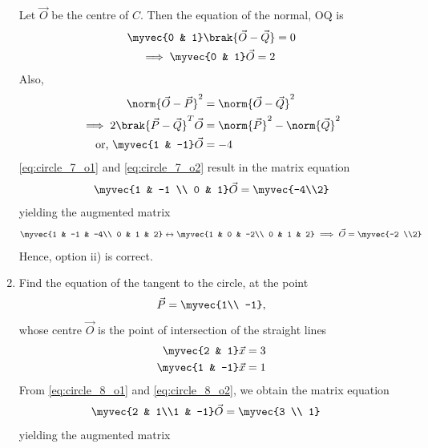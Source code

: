 \begin{enumerate}[label=\arabic*.,ref=\thesubsection.\theenumi]
\solution Let $\vec{O}$ be the centre of $C$. Then the equation of the normal, OQ is
\begin{align}
\myvec{0 & 1}\brak{\vec{O}-\vec{Q}} &= 0
\nonumber \\ 
\implies \myvec{0 & 1}\vec{O} = 2
\label{eq:circle_7_o1}
\end{align}
%
Also, 
\begin{align}
\norm{\vec{O}-\vec{P}}^2&=\norm{\vec{O}-\vec{Q}}^2 
\nonumber \\
\implies 2\brak{\vec{P}-\vec{Q}}^T\vec{O} &= \norm{\vec{P}}^2-\norm{\vec{Q}}^2 
\nonumber \\
\text{or, } \myvec{1 & -1}\vec{O} &= -4
\label{eq:circle_7_o2}
\end{align}
%
\eqref{eq:circle_7_o1} and \eqref{eq:circle_7_o2} result in the matrix equation
\begin{align}
\myvec{1 & -1 \\ 0 & 1}\vec{O} = \myvec{-4\\2}
\label{eq:circle_7_matrix}
\end{align}
yielding the augmented matrix
\begin{align}
\myvec{1 & -1 & -4\\ 0 & 1 & 2} \leftrightarrow \myvec{1 & 0 & -2\\ 0 & 1 & 2}\implies \vec{O} = \myvec{-2 \\2}
\label{eq:circle_7_o}
\end{align}
Hence, option ii)  is correct.
\item Find the equation of the tangent to the circle, at the point
\begin{equation}
\vec{P}=\myvec{1\\ -1},
\end{equation}
whose centre $\vec{O}$ is the point of intersection of the straight lines
\begin{align} 
\label{eq:circle_8_o1}
\myvec{2 & 1}\vec{x} &= 3
\\
\myvec{1 & -1}\vec{x} &= 1
\label{eq:circle_8_o2}
\end{align} 
\solution From \eqref{eq:circle_8_o1} and \eqref{eq:circle_8_o2}, we obtain the matrix equation
\begin{align} 
\myvec{2 & 1\\1 & -1}\vec{O} &= \myvec{3 \\ 1}
\end{align} 
yielding the augmented matrix
\begin{align} 

\end{align}
\end{enumerate}
